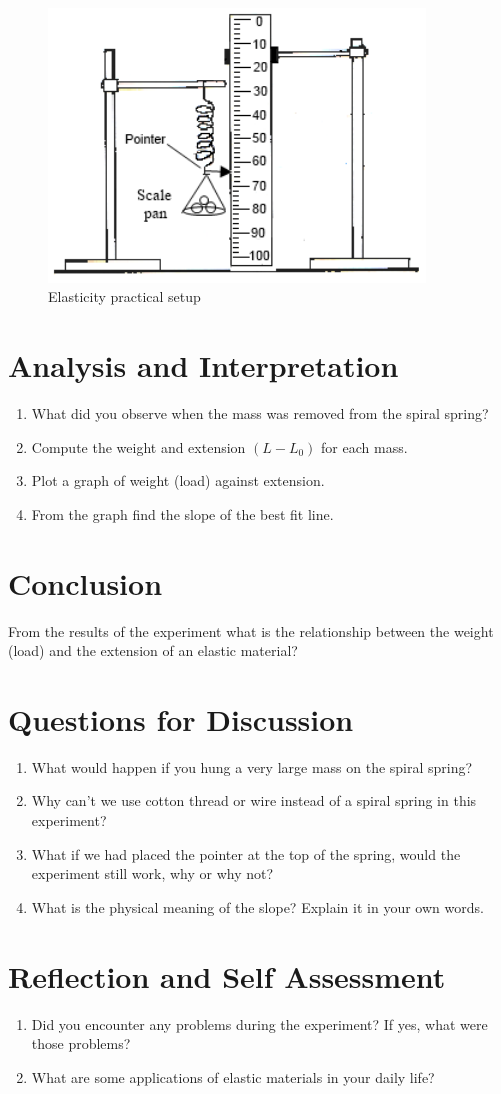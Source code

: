 \begin{figure}[h!]
\centering
\includegraphics[width=10cm]{./img/elasticity-1.png}
\caption{Elasticity practical setup}
\label{fig:elasticity-1}
\end{figure}

\section{Analysis and Interpretation}
\begin{enumerate}
\item What did you observe when the mass was removed from the spiral spring?
\item Compute the weight and extension $(L-L_0)$ for each mass.
\item Plot a graph of weight (load) against extension.
\item From the graph find the slope of the best fit line.
\end{enumerate}

\section{Conclusion}
From the results of the experiment what is the relationship between the weight (load) and the extension of an elastic material?

\section{Questions for Discussion}
\begin{enumerate}
\item What would happen if you hung a very large mass on the spiral spring?
\item Why can’t we use cotton thread or wire instead of a spiral spring in this experiment?
\item What if we had placed the pointer at the top of the spring, would the experiment still work, why or why not?
\item What is the physical meaning of the slope? Explain it in your own words.
\end{enumerate}

\section{Reflection and Self Assessment}
\begin{enumerate}
\item Did you encounter any problems during the experiment? If yes, what were those problems?
\item What are some applications of elastic materials in your daily life?
\end{enumerate}
